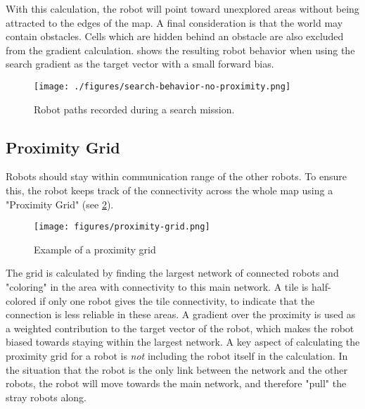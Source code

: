 With this calculation, the robot will point toward unexplored areas without being attracted to the edges of the map. A final consideration is that the world may contain obstacles. Cells which are hidden behind an obstacle are also excluded from the gradient calculation.  shows the resulting robot behavior when using the search gradient as the target vector with a small forward bias.

\begin{figure}[h]
    \begin{center}
        \texttt{[image: ./figures/search-behavior-no-proximity.png]}
    \end{center}
    \caption{Robot paths recorded during a search mission.}
    \label{fig:search-no-proximity}
\end{figure}

\subsection{Proximity Grid}
Robots should stay within communication range of the other robots. To ensure this, the robot keeps track of the connectivity {\color{red} across} the whole map using a "Proximity Grid" (see \cref{fig:proximity-grid}). \\
\begin{figure}[h]
    \begin{center}
        \texttt{[image: figures/proximity-grid.png]}
    \end{center}
    \caption{Example of a proximity grid}\label{fig:proximity-grid}
\end{figure}

The grid is calculated by finding the largest network of connected robots and "coloring" in the area with connectivity to this main network. A tile is half-colored if only one robot gives the tile connectivity, to indicate that the connection is less reliable in these areas. A {\color{red} gradient} over the proximity is used as a weighted contribution to the target vector of the robot, which makes the robot biased towards staying within the largest network. A key aspect of calculating the proximity grid for a robot is \emph{not} including the robot itself in the calculation. In the situation that the robot is the only link between the network and the other robots, the robot will move towards the main network, and therefore "pull" the stray robots along. 

